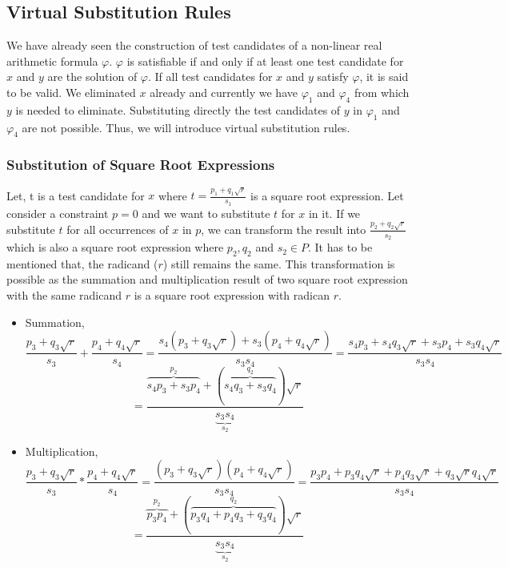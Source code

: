 \subsection{Virtual Substitution Rules}
We have already seen the construction of test candidates of a non-linear real arithmetic formula $\varphi $. $\varphi $ is satisfiable if and only if at least one test candidate for $x$ and $y$ are the solution of $\varphi $. If all test candidates for $x$ and $y$ satisfy $\varphi $, it is said to be valid.\newline
We eliminated $x$ already and currently we have $\varphi_{1}$ and $\varphi_{4}$ from which $y$ is needed to eliminate. Substituting directly the test candidates of $y$ in $\varphi_{1}$ and $\varphi_{4}$ are not possible. Thus, we will introduce virtual substitution rules. 
\subsubsection{Substitution of Square Root Expressions}
Let, t is a test candidate for $x$ where $t = \frac{p_{1}+q_{1}\sqrt{r}}{s_{1}}$ is a square root expression. Let consider a constraint $p=0$ and we want to substitute $t$ for $x$ in it. If we substitute $t$ for all occurrences of $x$ in $p$, we can transform the result into $\frac{p_{2}+q_{2}\sqrt{r}}{s_{2}}$ which is also a square root expression where $p_{2}, q_{2}$ and $s_{2}\in P$. It has to be mentioned that, the radicand ($r$) still remains the same. This transformation is possible as the summation and multiplication result of two square root expression with the same radicand $r$ is a square root expression with radican $r$.
\begin{itemize}
	\item Summation,
	$$ \frac{p_{3}+q_{3}\sqrt{r}}{s_{3}}+\frac{p_{4}+q_{4}\sqrt{r}}{s_{4}} = \frac{s_{4}(p_{3}+q_{3}\sqrt{r})+s_{3}(p_{4}+q_{4}\sqrt{r})}{s_{3}s_{4}} = \frac{s_{4}p_{3}+s_{4}q_{3}\sqrt{r}+s_{3}p_{4}+s_{3}q_{4}\sqrt{r}}{s_{3}s_{4}}$$
	$$ =\frac{\overbrace{s_{4}p_{3}+s_{3}p_{4}}\limits^{p_{2}}+(\overbrace{s_{4}q_{3}+s_{3}q_{4}}\limits^{q_{2}})\sqrt{r}}{\underbrace{s_{3}s_{4}}\limits_{s_{2}}}$$
	\item Multiplication,
	$$ \frac{p_{3}+q_{3}\sqrt{r}}{s_{3}}*\frac{p_{4}+q_{4}\sqrt{r}}{s_{4}} =
	\frac{(p_{3}+q_{3}\sqrt{r})(p_{4}+q_{4}\sqrt{r})}{s_{3}s_{4}} =
	\frac{p_{3}p_{4}+p_{3}q_{4}\sqrt{r}+p_{4}q_{3}\sqrt{r}+q_{3}\sqrt{r}q_{4}\sqrt{r}}{s_{3}s_{4}}$$
	$$
	=\frac{\overbrace{p_{3}p_{4}}\limits^{p_{2}}+(\overbrace{p_{3}q_{4}+p_{4}q_{3}+q_{3}q_{4}}\limits^{q_{2}})\sqrt{r}}{\underbrace{s_{3}s_{4}}\limits_{s_{2}}}$$
\end{itemize}

